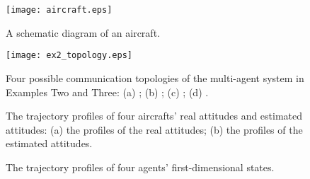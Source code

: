 \documentclass[12pt,draftcls,onecolumn]{IEEEtran}
\begin{document}
\begin{figure}[t]
\centering\tiny{}
\texttt{[image: aircraft.eps]}
  \caption{A schematic diagram of an aircraft.}\label{fig:aircraft}
\end{figure}

\begin{figure}[t]
\centering
\texttt{[image: ex2\_topology.eps]}
  \caption{Four possible communication topologies of the multi-agent system in Examples Two and Three: (a) ; (b) ; (c) ; (d) .}\label{fig:topology-ex2}
\end{figure}

\begin{figure}[t]
\centering {}
  \caption{The trajectory profiles of four aircrafts' real attitudes and estimated attitudes: (a) the profiles of the real attitudes; (b) the profiles of the estimated attitudes.}\label{fig:attitude}
\end{figure}

\begin{figure}[t]
\centering {}
  \caption{The trajectory profiles of four agents' first-dimensional states.}\label{fig:discreteagent}
\end{figure}
\end{document}
